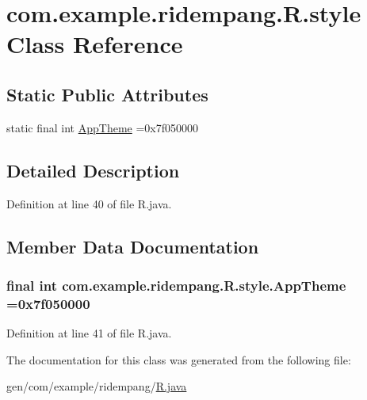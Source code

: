 \hypertarget{classcom_1_1example_1_1ridempang_1_1_r_1_1style}{\section{com.\-example.\-ridempang.\-R.\-style Class Reference}
\label{classcom_1_1example_1_1ridempang_1_1_r_1_1style}
}
\subsection*{Static Public Attributes}
\begin{DoxyCompactItemize}
\item 
static final int \hyperlink{classcom_1_1example_1_1ridempang_1_1_r_1_1style_a5213c0c3761cc112492d11bf5a939cee}{App\-Theme} =0x7f050000
\end{DoxyCompactItemize}


\subsection{Detailed Description}


Definition at line 40 of file R.\-java.



\subsection{Member Data Documentation}
\hypertarget{classcom_1_1example_1_1ridempang_1_1_r_1_1style_a5213c0c3761cc112492d11bf5a939cee}{
\subsubsection[{App\-Theme}]{\setlength{\rightskip}{0pt plus 5cm}final int com.\-example.\-ridempang.\-R.\-style.\-App\-Theme =0x7f050000\hspace{0.3cm}{\ttfamily [static]}}}\label{classcom_1_1example_1_1ridempang_1_1_r_1_1style_a5213c0c3761cc112492d11bf5a939cee}


Definition at line 41 of file R.\-java.



The documentation for this class was generated from the following file\-:\begin{DoxyCompactItemize}
\item 
gen/com/example/ridempang/\hyperlink{_r_8java}{R.\-java}\end{DoxyCompactItemize}
